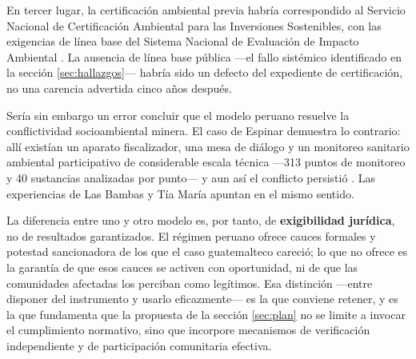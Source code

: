 En tercer lugar, la certificación ambiental previa habría correspondido al Servicio
Nacional de Certificación Ambiental para las Inversiones Sostenibles, con las
exigencias de línea base del Sistema Nacional de Evaluación de Impacto Ambiental
\parencite{congreso2001ley27446}. La ausencia de línea base pública —el fallo
sistémico identificado en la sección \ref{sec:hallazgos}— habría sido un defecto
del expediente de certificación, no una carencia advertida cinco años después.

Sería sin embargo un error concluir que el modelo peruano resuelve la
conflictividad socioambiental minera. El caso de Espinar demuestra lo contrario:
allí existían un aparato fiscalizador, una mesa de diálogo y un monitoreo sanitario
ambiental participativo de considerable escala técnica —313 puntos de monitoreo y
40 sustancias analizadas por punto— y aun así el conflicto persistió
\parencite{minam2013espinar}. Las experiencias de Las Bambas y Tía María apuntan
en el mismo sentido.

La diferencia entre uno y otro modelo es, por tanto, de \textbf{exigibilidad
jurídica}, no de resultados garantizados. El régimen peruano ofrece cauces
formales y potestad sancionadora de los que el caso guatemalteco careció; lo que
no ofrece es la garantía de que esos cauces se activen con oportunidad, ni de que
las comunidades afectadas los perciban como legítimos. Esa distinción —entre
disponer del instrumento y usarlo eficazmente— es la que conviene retener, y es la
que fundamenta que la propuesta de la sección \ref{sec:plan} no se limite a
invocar el cumplimiento normativo, sino que incorpore mecanismos de verificación
independiente y de participación comunitaria efectiva.
